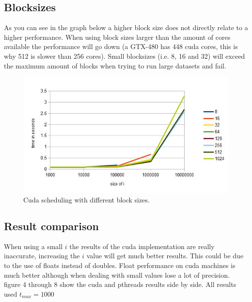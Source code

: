\documentclass[10pt]{article}
\begin{document}
\subsection{Blocksizes}
As you can see in the graph below a higher block size does not directly relate to a higher performance. When using block sizes larger than the amount of cores available the performance will go down (a GTX-480 has 448 cuda cores, this is why 512 is slower than 256 cores). Small blocksizes (i.e. 8, 16 and 32) will exceed the maximum amount of blocks when trying to run large datasets and fail. 
\begin{figure}[h]
  \centering
    \includegraphics[width=\textwidth]{threadblocksizes-1000timesteps.jpg}
  \caption{Cuda scheduling with different block sizes.}
\end{figure}
\break

\subsection{Result comparison}
When using a small $i$ the results of the cuda implementation are really inaccurate, increasing the $i$ value will get much better results. This could be due to the use of floats instead of doubles. Float performance on cuda machines is much better although when dealing with small values lose a lot of precision. figure 4 through 8 show the cuda and pthreads results side by side. All results used $t_{max} = 1000$
\end{document}

